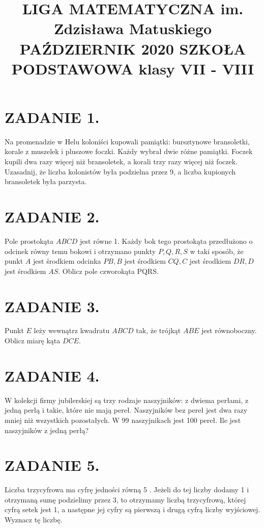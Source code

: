 \documentclass[10pt]{article}
\title{LIGA MATEMATYCZNA im. Zdzisława Matuskiego PAŹDZIERNIK 2020 SZKOŁA PODSTAWOWA klasy VII - VIII }
\author{}
\date{}
\begin{document}
\maketitle
\section*{ZADANIE 1.}
Na promenadzie w Helu koloniści kupowali pamiątki: bursztynowe bransoletki, korale z muszelek i pluszowe foczki. Każdy wybrał dwie różne pamiątki. Foczek kupili dwa razy więcej niż bransoletek, a korali trzy razy więcej niż foczek. Uzasadnij, że liczba kolonistów była podzielna przez 9, a liczba kupionych bransoletek była parzysta.

\section*{ZADANIE 2.}
Pole prostokąta \(A B C D\) jest równe 1. Każdy bok tego prostokąta przedłużono o odcinek równy temu bokowi i otrzymano punkty \(P, Q, R, S\) w taki sposób, że punkt \(A\) jest środkiem odcinka \(P B, B\) jest środkiem \(C Q, C\) jest środkiem \(D R, D\) jest środkiem \(A S\). Oblicz pole czworokąta PQRS.

\section*{ZADANIE 3.}
Punkt \(E\) leży wewnątrz kwadratu \(A B C D\) tak, że trójkąt \(A B E\) jest równoboczny. Oblicz miarę kąta \(D C E\).

\section*{ZADANIE 4.}
W kolekcji firmy jubilerskiej są trzy rodzaje naszyjników: z dwiema perłami, z jedną perłą i takie, które nie mają pereł. Naszyjników bez pereł jest dwa razy mniej niż wszystkich pozostałych. W 99 naszyjnikach jest 100 pereł. Ile jest naszyjników z jedną perłą?

\section*{ZADANIE 5.}
Liczba trzycyfrowa ma cyfrę jedności równą 5 . Jeżeli do tej liczby dodamy 1 i otrzymaną sumę podzielimy przez 3, to otrzymamy liczbą trzycyfrową, której cyfrą setek jest 1, a następne jej cyfry są pierwszą i drugą cyfrą liczby wyjściowej. Wyznacz tę liczbę.
\end{document}
